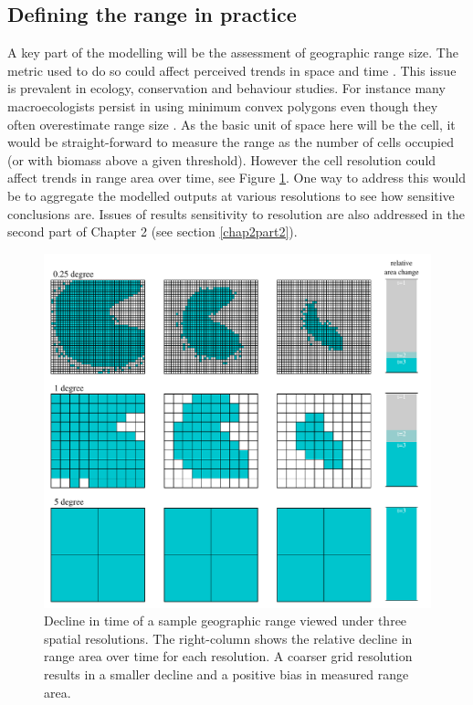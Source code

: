 \documentclass{article}
\begin{document}
\subsection{Defining the range in practice}
A key part of the modelling will be the assessment of geographic
range size. The metric used to do so could affect perceived trends in
space and time \citep{Hurlbert2007_a}. This issue is prevalent in
ecology, conservation and behaviour studies. For instance many
macroecologists persist in using minimum convex polygons even though
they often overestimate range size \citep{Burgman2003_a}. As
the basic unit of space here will be the cell, it would be
straight-forward to measure the range as the number of cells occupied
(or with biomass above a given threshold). However the cell resolution
could affect trends in range area over time, see Figure \ref{figspatialres}. One way to
address this would be to aggregate the modelled outputs at various
resolutions to see how sensitive conclusions are. Issues of results
sensitivity to resolution are also addressed in the second part of
Chapter 2 (see section \ref{chap2part2}).

\begin{figure}
\centering
\includegraphics[scale=0.58]{LTB_ResearchProposal_SpatialResolutionFig}
\caption{Decline in time of a sample geographic range viewed under three spatial
  resolutions. The right-column shows the relative decline in range
  area over time for each resolution. A coarser grid resolution
  results in a smaller decline and a positive bias in measured range area.
\label{figspatialres}}
\end{figure}
\end{document}
